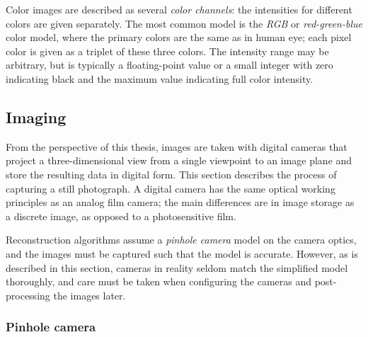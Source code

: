 Color images are described as several \emph{color channels}: the intensities for different colors are given separately.
The most common model is the \emph{RGB} or \emph{red-green-blue} color model, where the primary colors are the same as in human eye; each pixel color is given as a triplet of these three colors.
The intensity range may be arbitrary, but is typically a floating-point value or a small integer with zero indicating black and the maximum value indicating full color intensity.
\cite{pitas2000digital}


\subsection{Imaging} \label{sec:imaging} %

From the perspective of this thesis, images are taken with digital cameras that project a three-dimensional view from a single viewpoint to an image plane and store the resulting data in digital form.
This section describes the process of capturing a still photograph.
A digital camera has the same optical working principles as an analog film camera;
the main differences are in image storage as a discrete image, as opposed to a photosensitive film.

Reconstruction algorithms assume a \emph{pinhole camera} model on the camera optics, and the images must be captured such that the model is accurate.
However, as is described in this section, cameras in reality seldom match the simplified model thoroughly, and care must be taken when configuring the cameras and post-processing the images later.


\subsubsection{Pinhole camera} \label{sec:pinhole} %



